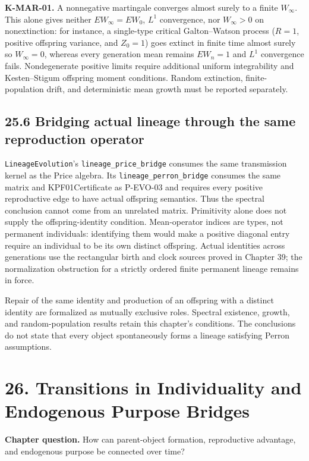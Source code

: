 \documentclass[
  english,
  11pt,
  oneside]{book}
\newcounter{none} %
\begin{document}
\textbf{K-MAR-01.} A nonnegative martingale converges almost surely to a finite \(W_\infty\). This alone gives neither \(EW_\infty=EW_0\), \(L^1\) convergence, nor \(W_\infty>0\) on nonextinction: for instance, a single-type critical Galton--Watson process (\(R=1\), positive offspring variance, and \(Z_0=1\)) goes extinct in finite time almost surely so \(W_\infty=0\), whereas every generation mean remains \(EW_n=1\) and \(L^1\) convergence fails. Nondegenerate positive limits require additional uniform integrability and Kesten--Stigum offspring moment conditions. Random extinction, finite-population drift, and deterministic mean growth must be reported separately.

\section{25.6 Bridging actual lineage through the same reproduction operator}\label{bridging-actual-lineage-through-the-same-reproduction-operator}

\nolinkurl{LineageEvolution}'s \nolinkurl{lineage_price_bridge} consumes the same transmission kernel as the Price algebra. Its \nolinkurl{lineage_perron_bridge} consumes the same matrix and KPF01Certificate as P-EVO-03 and requires every positive reproductive edge to have actual offspring semantics. Thus the spectral conclusion cannot come from an unrelated matrix. Primitivity alone does not supply the offspring-identity condition. Mean-operator indices are types, not permanent individuals: identifying them would make a positive diagonal entry require an individual to be its own distinct offspring. Actual identities across generations use the rectangular birth and clock sources proved in Chapter 39; the normalization obstruction for a strictly ordered finite permanent lineage remains in force.

Repair of the same identity and production of an offspring with a distinct identity are formalized as mutually exclusive roles. Spectral existence, growth, and random-population results retain this chapter's conditions. The conclusions do not state that every object spontaneously forms a lineage satisfying Perron assumptions.

\chapter{26. Transitions in Individuality and Endogenous Purpose Bridges}\label{ch-26}

\textbf{Chapter question.} How can parent-object formation, reproductive advantage, and endogenous purpose be connected over time?
\end{document}
